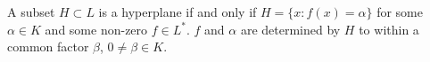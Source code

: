A subset $H \subset L$ is a hyperplane if and only if $H = \{x: f(x) = \alpha\}$ for some $\alpha \in K$ and some non-zero $f \in L^*$. $f$ and $\alpha$ are determined by $H$ to within a common factor $\beta$, $0 \neq \beta \in K$.
